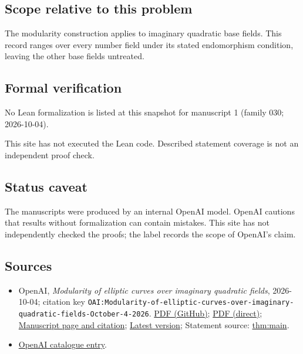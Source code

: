 \documentclass[11pt]{article}
\begin{document}
\subsection{Scope relative to this problem}
The modularity construction applies to imaginary quadratic base fields. This record ranges over every number field under its stated endomorphism condition, leaving the other base fields untreated.

\subsection{Formal verification}
No Lean formalization is listed at this snapshot for manuscript 1 (family 030; 2026-10-04).

This site has not executed the Lean code. Described statement coverage is not an independent proof check.

\subsection{Status caveat}
The manuscripts were produced by an internal OpenAI model. OpenAI cautions that results without formalization can contain mistakes. This site has not independently checked the proofs; the label records the scope of OpenAI's claim.

\subsection{Sources}
\begin{itemize}
\item OpenAI, \emph{Modularity of elliptic curves over imaginary quadratic fields}, 2026-10-04; citation key \texttt{OAI:Modularity-of-elliptic-curves-over-imaginary-quadratic-fields-October-4-2026}. \href{https://github.com/openai/math/blob/adc7f1241b42e322a6451854ab7e4b4c146bf78a/preprints/Modularity-of-elliptic-curves-over-imaginary-quadratic-fields-October-4-2026/paper.pdf}{PDF (GitHub)}; \href{https://github.com/openai/math/raw/adc7f1241b42e322a6451854ab7e4b4c146bf78a/preprints/Modularity-of-elliptic-curves-over-imaginary-quadratic-fields-October-4-2026/paper.pdf}{PDF (direct)}; \href{https://github.com/openai/math/blob/adc7f1241b42e322a6451854ab7e4b4c146bf78a/preprints/Modularity-of-elliptic-curves-over-imaginary-quadratic-fields-October-4-2026/README.md}{Manuscript page and citation}; \href{https://github.com/openai/math/blob/main/preprints/Modularity-of-elliptic-curves-over-imaginary-quadratic-fields-October-4-2026/paper.pdf}{Latest version}; Statement source: \href{https://github.com/openai/math/blob/adc7f1241b42e322a6451854ab7e4b4c146bf78a/preprints/Modularity-of-elliptic-curves-over-imaginary-quadratic-fields-October-4-2026/build/sections/introduction.tex\#L17}{thm:main}.
\item \href{https://github.com/openai/math/blob/adc7f1241b42e322a6451854ab7e4b4c146bf78a/CONTENTS.md}{OpenAI catalogue entry}.
\end{itemize}
\end{document}
